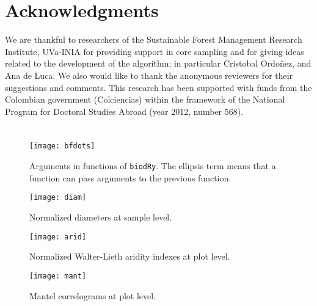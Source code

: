 \documentclass[review,authoryear]{elsarticle}
\begin{document}
\section{Acknowledgments}

We are thankful to researchers of the Sustainable Forest Management
Research Institute, UVa-INIA for providing support in core sampling
and for giving ideas related to the development of the algorithm; in
particular Cristobal Ordo\~nez, and Ana de Luca. We also would like to
thank the anonymous reviewers for their suggestions and
comments. This research has been supported with funds from the
Colombian government (Colciencias) within the framework of the
National Program for Doctoral Studies Abroad (year 2012, number 568).

\newpage
\section{\refname}



\clearpage
\begin{figure}\centering
\texttt{[image: bfdots]}
\caption{Arguments in functions of {\tt biodRy}. The ellipsis term
  means that a function can pass arguments to the previous function.}
\label{fig:fdots} 
\end{figure}

\clearpage
\begin{figure}\centering
\texttt{[image: diam]} 
\caption{Normalized diameters at sample level.}
\label{fig:diam} 
\end{figure}

\clearpage
\begin{figure}\centering
\texttt{[image: arid]} 
\caption{Normalized Walter-Lieth aridity indexes at plot level.}
\label{fig:fdots} 
\end{figure}

\clearpage
\begin{figure}\centering
\texttt{[image: mant]} 
\caption{Mantel correlograms at plot level.}
\label{fig:mant} 
\end{figure}
\end{document}
